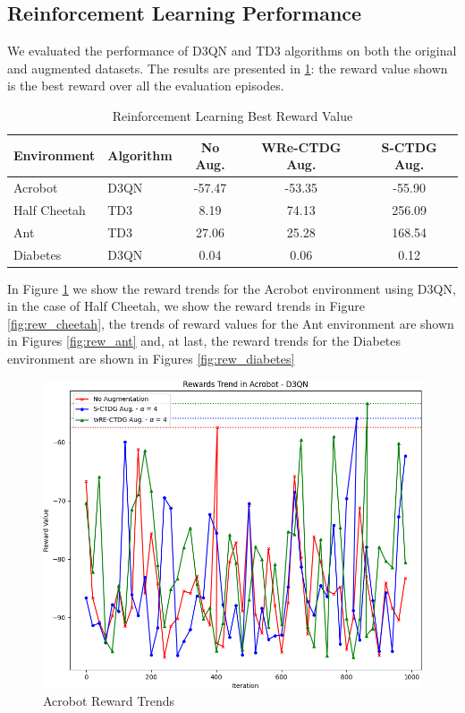 \subsection{Reinforcement Learning Performance}

We evaluated the performance of D3QN and TD3 algorithms on both the
original and augmented datasets. The results are presented
in \ref{tab:rl_reward}: the reward value shown is the best reward
over all the evaluation episodes.

\begin{table}[h]
    \centering
    \begin{tabular}{@{}llccc@{}}
        \toprule
        \textbf{Environment} & \textbf{Algorithm} & \textbf{No Aug.} & \textbf{WRe-CTDG Aug.} & \textbf{S-CTDG Aug.} \\ \midrule
        Acrobot              & D3QN               & -57.47           & -53.35                 & -55.90               \\
        Half Cheetah         & TD3                & 8.19             & 74.13                  & 256.09                \\
        Ant                  & TD3                & 27.06            & 25.28                  & 168.54                 \\
        Diabetes             & D3QN               & 0.04             & 0.06                   & 0.12                   \\ \bottomrule
    \end{tabular}
    \caption{Reinforcement Learning Best Reward Value}
    \label{tab:rl_reward}
\end{table}

In Figure \ref{fig:rew_acrobot} we show the reward trends for the
Acrobot environment using D3QN,
in the case of Half Cheetah, we show the reward trends in
Figure \ref{fig:rew_cheetah},
the trends of reward values for the Ant environment
are shown in Figures \ref{fig:rew_ant} and,
at last, the reward trends for the Diabetes environment are shown in
Figures \ref{fig:rew_diabetes}

\begin{figure}[H]
    \centering
    \includegraphics[width=.8\textwidth]{figures/ch5/rew_acrobot.png}
    \caption{Acrobot Reward Trends}
    \label{fig:rew_acrobot}
\end{figure}

